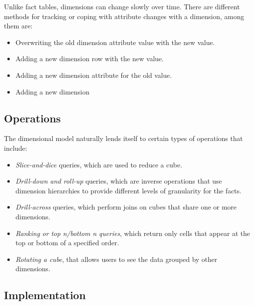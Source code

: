 \documentclass[]{article}
\begin{document}
Unlike fact tables, dimensions can change slowly over time. There are different methods for tracking or coping with attribute changes with a dimension, among them are:
\begin{itemize}
	\item Overwriting the old dimension attribute value with the new value.
	\item Adding a new dimension row with the new value.
	\item Adding a new dimension attribute for the old value.
	\item Adding a new dimension
\end{itemize}


\subsection{Operations} %
\label{sub:operations}

The dimensional model naturally lends itself to certain types of operations that include:

\begin{itemize}
	\item \emph{Slice-and-dice} queries, which are used to reduce a cube. 
	\item \emph{Drill-down and roll-up} queries, which are inverse operations that use dimension hierarchies to provide different levels of granularity for the facts.
	\item \emph{Drill-across} queries, which perform joins on cubes that share one or more dimensions. 
	\item \emph{Ranking or top n/bottom n queries}, which return only cells that appear at the top or bottom of a specified order.
	\item \emph{Rotating a cube}, that allows users to see the data grouped by other dimensions.
\end{itemize}


\subsection{Implementation} %
\label{sub:implementation}
\end{document}
